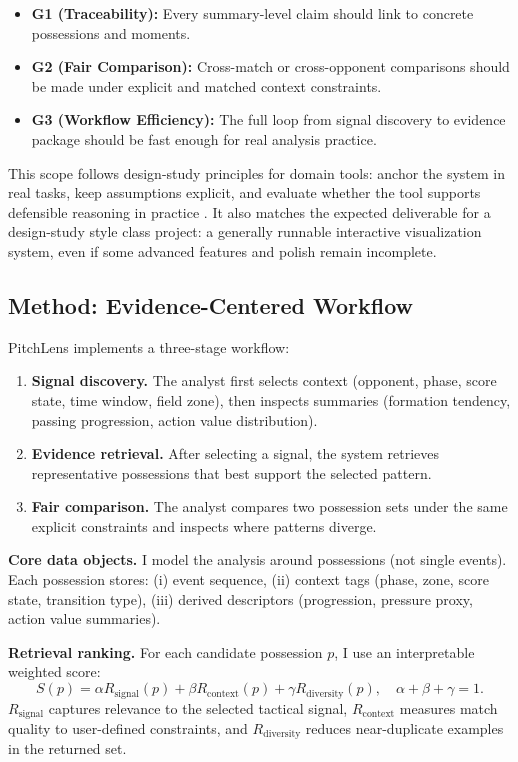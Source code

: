 \documentclass{vgtc}                          %
\begin{document}
\begin{itemize}[leftmargin=*]
\item \textbf{G1 (Traceability):} Every summary-level claim should link to concrete possessions and moments.
\item \textbf{G2 (Fair Comparison):} Cross-match or cross-opponent comparisons should be made under explicit and matched context constraints.
\item \textbf{G3 (Workflow Efficiency):} The full loop from signal discovery to evidence package should be fast enough for real analysis practice.
\end{itemize}

This scope follows design-study principles for domain tools: anchor the system in real tasks, keep assumptions explicit, and evaluate whether the tool supports defensible reasoning in practice \cite{Sedlmair2012DesignStudy,Munzner2009NestedModel}. It also matches the expected deliverable for a design-study style class project: a generally runnable interactive visualization system, even if some advanced features and polish remain incomplete.

\subsection{Method: Evidence-Centered Workflow}
PitchLens implements a three-stage workflow:

\begin{enumerate}[leftmargin=*]
\item \textbf{Signal discovery.} The analyst first selects context (opponent, phase, score state, time window, field zone), then inspects summaries (formation tendency, passing progression, action value distribution).
\item \textbf{Evidence retrieval.} After selecting a signal, the system retrieves representative possessions that best support the selected pattern.
\item \textbf{Fair comparison.} The analyst compares two possession sets under the same explicit constraints and inspects where patterns diverge.
\end{enumerate}

\noindent\textbf{Core data objects.}
I model the analysis around possessions (not single events). Each possession stores:
(i) event sequence,
(ii) context tags (phase, zone, score state, transition type),
(iii) derived descriptors (progression, pressure proxy, action value summaries).

\noindent\textbf{Retrieval ranking.}
For each candidate possession $p$, I use an interpretable weighted score:
\[
S(p)=\alpha R_{\mathrm{signal}}(p)+\beta R_{\mathrm{context}}(p)+\gamma R_{\mathrm{diversity}}(p), \quad
\alpha+\beta+\gamma=1.
\]
$R_{\mathrm{signal}}$ captures relevance to the selected tactical signal, $R_{\mathrm{context}}$ measures match quality to user-defined constraints, and $R_{\mathrm{diversity}}$ reduces near-duplicate examples in the returned set.
\end{document}
